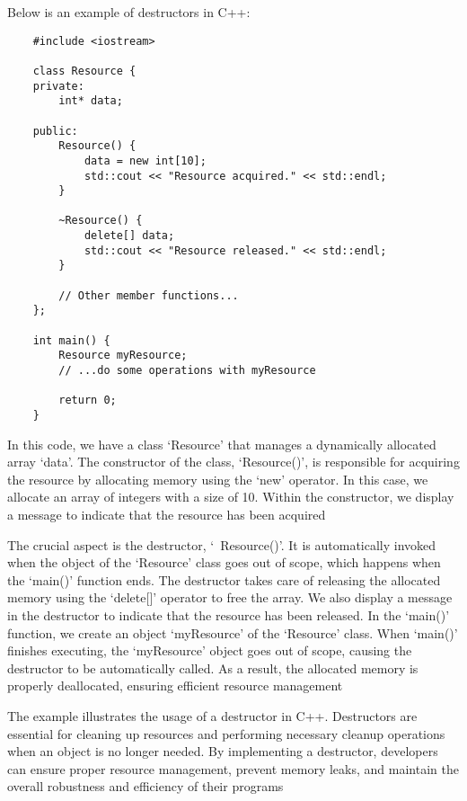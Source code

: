 \begin{solution}
    Below is an example of destructors in C++:
    
    \horizontalline
    
    \begin{verbatim}   
    #include <iostream>

    class Resource {
    private:
        int* data;
    
    public:
        Resource() {
            data = new int[10];
            std::cout << "Resource acquired." << std::endl;
        }
    
        ~Resource() {
            delete[] data;
            std::cout << "Resource released." << std::endl;
        }
    
        // Other member functions...
    };
    
    int main() {
        Resource myResource;
        // ...do some operations with myResource
    
        return 0;
    }
        \end{verbatim}
    
    \horizontalline

    In this code, we have a class `Resource' that manages a dynamically allocated array `data'. The constructor of the class, `Resource()', is responsible for acquiring the resource by allocating memory using the `new' operator. In this case, we allocate an 
    array of integers with a size of 10. Within the constructor, we display a message to indicate that the resource has been acquired
    
    The crucial aspect is the destructor, `~Resource()'. It is automatically invoked when the object of the `Resource' class goes out of scope, which happens when the `main()' function ends. The destructor takes care of releasing the allocated memory using 
    the `delete[]' operator to free the array. We also display a message in the destructor to indicate that the resource has been released. In the `main()' function, we create an object `myResource' of the `Resource' class. When `main()' finishes executing, 
    the `myResource' object goes out of scope, causing the destructor to be automatically called. As a result, the allocated memory is properly deallocated, ensuring efficient resource management
    
    The example illustrates the usage of a destructor in C++. Destructors are essential for cleaning up resources and performing necessary cleanup operations when an object is no longer needed. By implementing a destructor, developers can ensure proper resource 
    management, prevent memory leaks, and maintain the overall robustness and efficiency of their programs
\end{solution}

